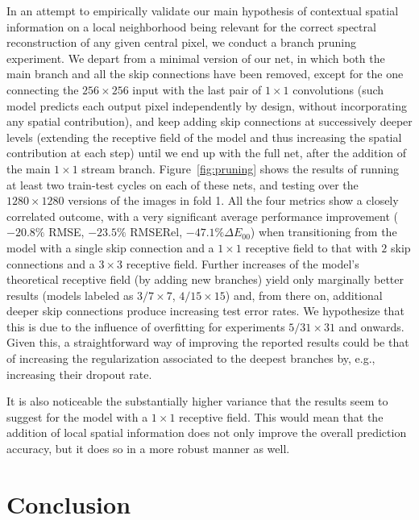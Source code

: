 \documentclass[10pt,twocolumn,letterpaper]{article}
\begin{document}
In an attempt to empirically validate our main hypothesis of contextual spatial information on a local neighborhood being relevant for the correct spectral reconstruction of any given central pixel, we conduct a branch pruning experiment. We depart from a minimal version of our net, in which both the main branch and all the skip connections have been removed, except for the one connecting the $256\times256$ input with the last pair of $1\times1$ convolutions (such model predicts each output pixel independently by design, without incorporating any spatial contribution), and keep adding skip connections at successively deeper levels (extending the receptive field of the model and thus increasing the spatial contribution at each step) until we end up with the full net, after the addition of the main $1\times1$ stream branch. Figure~\ref{fig:pruning} shows the results of running at least two train-test cycles on each of these nets, and testing over the $1280\times1280$ versions of the images in fold 1. All the four metrics show a closely correlated outcome, with a very significant average performance improvement ($-20.8\%$ RMSE, $-23.5\%$ RMSERel, $-47.1\% \Delta E_{00}$) when transitioning from the model with a single skip connection and a $1\times1$ receptive field to that with $2$ skip connections and a $3\times3$ receptive field. Further increases of the model's theoretical receptive field (by adding new branches) yield only marginally better results (models labeled as $3/ 7\times7$, $4/ 15\times15$) and, from there on, additional deeper skip connections produce increasing test error rates. We hypothesize that this is due to the influence of overfitting for experiments $5/ 31\times31$ and onwards. Given this, a straightforward way of improving the reported results could be that of increasing the regularization associated to the deepest branches by, e.g., increasing their dropout rate.

It is also noticeable the substantially higher variance that the results seem to suggest for the model with a $1\times1$ receptive field. This would mean that the addition of local spatial information does not only improve the overall prediction accuracy, but it does so in a more robust manner as well. 

\section{Conclusion}
\label{sec:conclusion}
\end{document}
